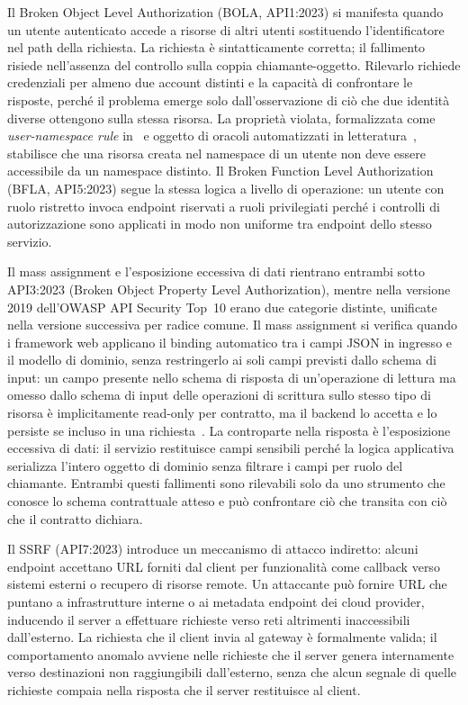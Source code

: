 Il Broken Object Level Authorization (\gls{BOLA}, API1:2023) si manifesta quando un utente autenticato accede a risorse di altri utenti sostituendo l'identificatore nel path della richiesta. La richiesta è sintatticamente corretta; il fallimento risiede nell'assenza del controllo sulla coppia chiamante-oggetto. Rilevarlo richiede credenziali per almeno due account distinti e la capacità di confrontare le risposte, perché il problema emerge solo dall'osservazione di ciò che due identità diverse ottengono sulla stessa risorsa. La proprietà violata, formalizzata come \emph{user-namespace rule} in~\cite{atlidakisCheckingSecurityProperties2020} e oggetto di oracoli automatizzati in letteratura~\cite{sahinEnhancingRESTAPI2026}, stabilisce che una risorsa creata nel namespace di un utente non deve essere accessibile da un namespace distinto.
Il Broken Function Level Authorization (\gls{BFLA}, API5:2023) segue la stessa logica a livello di operazione: un utente con ruolo ristretto invoca endpoint riservati a ruoli privilegiati perché i controlli di autorizzazione sono applicati in modo non uniforme tra endpoint dello stesso servizio.

Il mass assignment e l'esposizione eccessiva di dati rientrano entrambi sotto API3:2023 (Broken Object Property Level Authorization), mentre nella versione 2019 dell'OWASP API Security Top~10 erano due categorie distinte, unificate nella versione successiva per radice comune.
Il mass assignment si verifica quando i framework web applicano il binding automatico tra i campi JSON in ingresso e il modello di dominio, senza restringerlo ai soli campi previsti dallo schema di input: un campo presente nello schema di risposta di un'operazione di lettura ma omesso dallo schema di input delle operazioni di scrittura sullo stesso tipo di risorsa è implicitamente read-only per contratto, ma il backend lo accetta e lo persiste se incluso in una richiesta~\cite{corradiniAutomatedBlackBoxTesting2023}.
La controparte nella risposta è l'esposizione eccessiva di dati: il servizio restituisce campi sensibili perché la logica applicativa serializza l'intero oggetto di dominio senza filtrare i campi per ruolo del chiamante. Entrambi questi fallimenti sono rilevabili solo da uno strumento che conosce lo schema contrattuale atteso e può confrontare ciò che transita con ciò che il contratto dichiara.

Il \gls{SSRF} (API7:2023) introduce un meccanismo di attacco indiretto: alcuni endpoint accettano \gls{URL} forniti dal client per funzionalità come callback verso sistemi esterni o recupero di risorse remote. Un attaccante può fornire \gls{URL} che puntano a infrastrutture interne o ai metadata endpoint dei cloud provider, inducendo il server a effettuare richieste verso reti altrimenti inaccessibili dall'esterno. La richiesta che il client invia al gateway è formalmente valida; il comportamento anomalo avviene nelle richieste che il server genera internamente verso destinazioni non raggiungibili dall'esterno, senza che alcun segnale di quelle richieste compaia nella risposta che il server restituisce al client.

